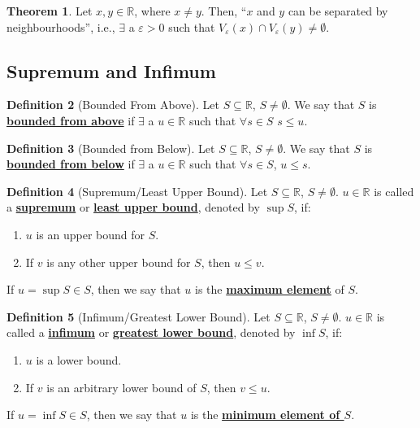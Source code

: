 \documentclass[reqno,11pt]{amsart}
\theoremstyle{definition}
\newtheorem{theorem}{Theorem}
\theoremstyle{definition}
\newtheorem{definition}[theorem]{Definition}
\theoremstyle{remark}
\newcommand{\R}{\mathbb{R}}
\newcommand{\dfn}[1]{\underline{\textbf{#1}}}
\begin{document}
\begin{theorem}
	Let $x, y \in \R$, where $x \neq y$. Then, ``$x$ and $y$ can be separated by neighbourhoods'', i.e., $\exists$ a $\varepsilon > 0$ such that $V_\varepsilon(x) \cap V_\varepsilon(y) \neq \emptyset$.
\end{theorem}

\subsection{Supremum and Infimum}
\begin{definition}[Bounded From Above]
	Let $S \subseteq \R$, $S \neq \emptyset$. We say that $S$ is \dfn{bounded from above} if $\exists$ a $u \in \R$ such that $\forall s \in S$ $s \leq u$.
\end{definition}


\begin{definition}[Bounded from Below]
	Let $S \subseteq \R$, $S \neq \emptyset$. We say that $S$ is \dfn{bounded from below} if $\exists$ a $u \in \R$ such that $\forall s \in S$, $u \leq s$.
\end{definition}


\begin{definition}[Supremum/Least Upper Bound]
	Let $S \subseteq \R$, $S \neq \emptyset$. $u \in \R$ is called a \dfn{supremum} or \dfn{least upper bound}, denoted by $\sup{S}$, if: 
	\begin{enumerate}[noitemsep]
		\item $u$ is an upper bound for $S$. 
		\item If $v$ is any other upper bound for $S$, then $u \leq v$.
	\end{enumerate}
	If $u = \sup{S} \in S$, then we say that $u$ is the \dfn{maximum element} of $S$.
\end{definition}

\begin{definition}[Infimum/Greatest Lower Bound]
	Let $S \subseteq \R$, $S \neq \emptyset$. $u \in \R$ is called a \dfn{infimum} or \dfn{greatest lower bound}, denoted by $\inf{S}$, if: 	
	\begin{enumerate}[noitemsep]
		\item $u$ is a lower bound.
		\item If $v$ is an arbitrary lower bound of $S$, then $v \leq u$.
	\end{enumerate}
	If $u = \inf{S} \in S$, then we say that $u$ is the \dfn{minimum element of $S$}.
\end{definition}
\end{document}
